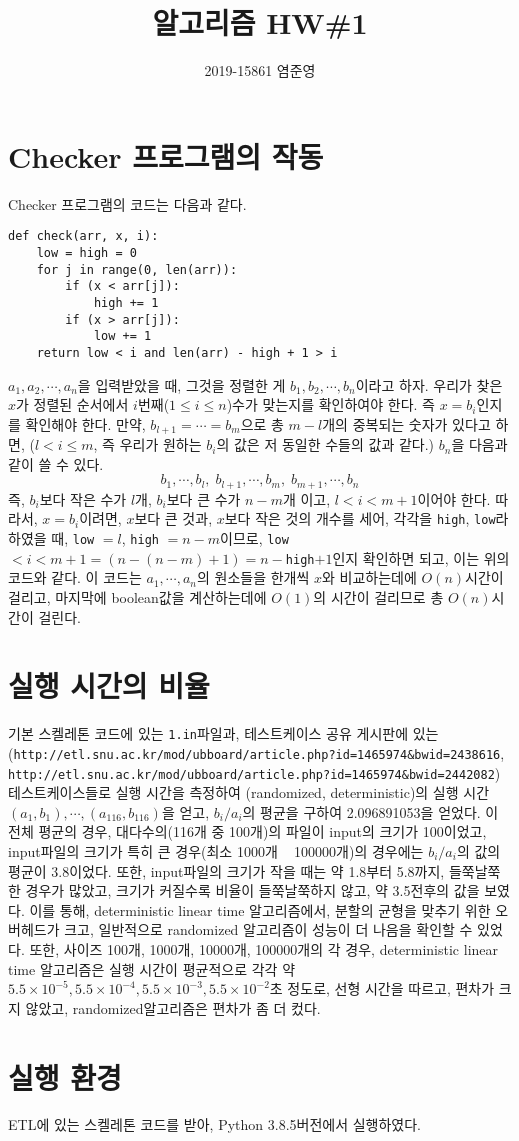 \documentclass{article}
\title{알고리즘 HW\#1}
\author{2019-15861 염준영}
\begin{document}
\maketitle
\section{Checker 프로그램의 작동}
Checker 프로그램의 코드는 다음과 같다.
\begin{verbatim}
def check(arr, x, i):
    low = high = 0
    for j in range(0, len(arr)):
        if (x < arr[j]):
            high += 1
        if (x > arr[j]):
            low += 1
    return low < i and len(arr) - high + 1 > i
\end{verbatim}
\(a_1, a_2, \cdots, a_n\)을 입력받았을 때, 그것을 정렬한 게 
\(b_1, b_2, \cdots, b_n\)이라고 하자.
우리가 찾은 \(x\)가 정렬된 순서에서 \(i\)번째(\(1 \leq i \leq n\))수가 맞는지를 확인하여야 한다.
즉 \(x = b_i\)인지를 확인해야 한다.
만약, \(b_{l + 1} = \cdots = b_m\)으로 총 \(m - l\)개의 중복되는 숫자가 있다고 하면,
(\(l < i \leq m\), 즉 우리가 원하는 \(b_i\)의 값은 저 동일한 수들의 값과 같다.)
\(b_n\)을 다음과 같이 쓸 수 있다.
$$b_1 , \cdots , b_{l},\; b_{l + 1}, \cdots, b_{m},\; b_{m+1}, \cdots, b_n$$
즉, \(b_{i}\)보다 작은 수가 \(l\)개, \(b_i\)보다 큰 수가 \(n - m\)개 이고,
\(l < i < m + 1\)이어야 한다.
따라서, \(x = b_i\)이려면,
\(x\)보다 큰 것과, \(x\)보다 작은 것의 개수를 세어, 각각을 \verb|high|, \verb|low|라 하였을 때,
\verb|low| \(= l\), \verb|high| \(= n - m\)이므로,
\verb|low| \(< i < m + 1 = (n - (n - m) + 1) = n - \)\verb|high|\(+ 1\)인지 확인하면 되고, 이는 위의 코드와 같다.
이 코드는 \(a_1, \cdots, a_n\)의 원소들을 한개씩 \(x\)와 비교하는데에 \(O(n)\)시간이 걸리고,
마지막에 boolean값을 계산하는데에 \(O(1)\)의 시간이 걸리므로 총
\(O(n)\)시간이 걸린다.

\section{실행 시간의 비율}
기본 스켈레톤 코드에 있는 \verb|1.in|파일과, 
테스트케이스 공유 게시판에 있는\\
 (\verb|http://etl.snu.ac.kr/mod/ubboard/article.php?id=1465974&bwid=2438616|, \verb|http://etl.snu.ac.kr/mod/ubboard/article.php?id=1465974&bwid=2442082|) 
테스트케이스들로 실행 시간을 측정하여
(randomized, deterministic)의 실행 시간
\((a_1, b_1), \cdots, (a_{116}, b_{116})\)을 얻고, \(b_i / a_i\)의 평균을 구하여
2.096891053을 얻었다.
이 전체 평균의 경우, 대다수의(116개 중 100개)의 파일이 input의 크기가 100이었고,
input파일의 크기가 특히 큰 경우(최소 1000개 ~ 100000개)의 경우에는
\(b_i / a_i\)의 값의 평균이 \(3.8\)이었다.
또한, input파일의 크기가 작을 때는 약 1.8부터 5.8까지, 들쭉날쭉한 경우가 많았고,
크기가 커질수록 비율이 들쭉날쭉하지 않고, 약 3.5전후의 값을 보였다.
이를 통해, deterministic linear time 알고리즘에서, 분할의 균형을 맞추기 위한 오버헤드가
크고, 일반적으로 randomized 알고리즘이 성능이 더 나음을 확인할 수 있었다.
또한, 사이즈 100개, 1000개, 10000개, 100000개의 각 경우,
deterministic linear time 알고리즘은 실행 시간이 평균적으로 각각
약 \(5.5 \times 10^{-5}, 5.5 \times 10^{-4}, 5.5 \times 10^{-3}, 5.5 \times 10^{-2}\)초 정도로,
선형 시간을 따르고, 편차가 크지 않았고, randomized알고리즘은 편차가 좀 더 컸다.


\section{실행 환경}
ETL에 있는 스켈레톤 코드를 받아, Python 3.8.5버전에서 실행하였다.
\end{document}
